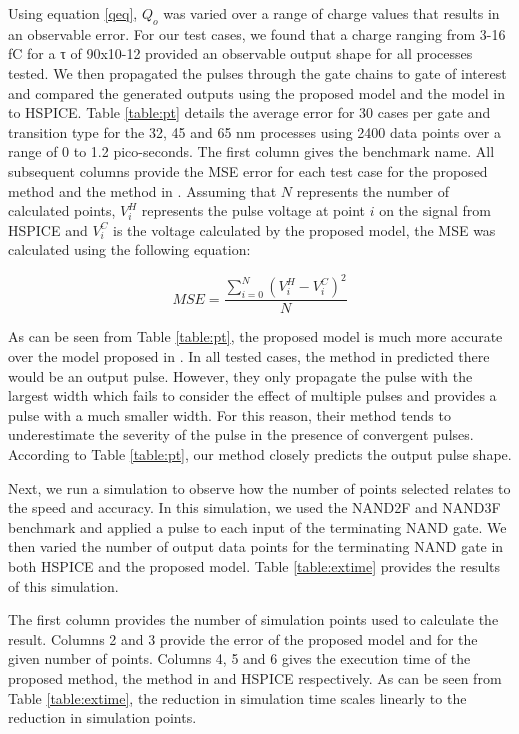 Using equation \ref{qeq}, $Q_o$ was varied over a range of charge values that results in an observable error. For our test cases, we found that a charge ranging from 3-16 fC for a τ of 90x10-12 provided an observable output shape for all processes tested. We then propagated the pulses through the gate chains to gate of interest and compared the generated outputs using the proposed model and the model in \cite{Accurate_Masking} to HSPICE. Table \ref{table:pt} details the average error for 30 cases per gate and transition type for the 32, 45 and 65 nm processes using 2400 data points over a range of 0 to 1.2 pico-seconds. The first column gives the benchmark name. All subsequent columns provide the MSE error for each test case for the proposed method and the method in \cite{Accurate_Masking}. Assuming that $N$ represents the number of calculated points, $V_i^H$ represents the pulse voltage at point $i$ on the signal from HSPICE and $V_i^C$ is the voltage calculated by the proposed model, the MSE was calculated using the following equation:

\begin{equation}
MSE = \frac{\sum_{i=0}^{N} (V_i^H - V_i^C)^2}{N}
\end{equation}

As can be seen from Table \ref{table:pt}, the proposed model is much more accurate over the model proposed in \cite{Accurate_Masking}. In all tested cases, the method in \cite{Accurate_Masking} predicted there would be an output pulse. However, they only propagate the pulse with the largest width which fails to consider the effect of multiple pulses and provides a pulse with a much smaller width. For this reason, their method tends to underestimate the severity of the pulse in the presence of convergent pulses. According to Table \ref{table:pt}, our method closely predicts the output pulse shape.

Next, we run a simulation to observe how the number of points selected relates to the speed and accuracy. In this simulation, we used the NAND2F and NAND3F benchmark and applied a pulse to each input of the terminating NAND gate. We then varied the number of output data points for the terminating NAND gate in both HSPICE and the proposed model. Table \ref{table:extime} provides the results of this simulation.

The first column provides the number of simulation points used to calculate the result. Columns 2 and 3 provide the error of the proposed model and \cite{Accurate_Masking} for the given number of points. Columns 4, 5 and 6 gives the execution time of the proposed method, the method in \cite{Accurate_Masking} and HSPICE respectively. As can be seen from Table \ref{table:extime}, the reduction in simulation time scales linearly to the reduction in simulation points. 

